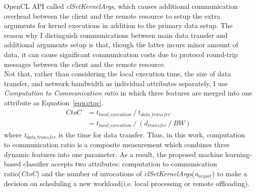 OpenCL API called {\it clSetKernelArgs}, which causes additional
communication overhead between the client and the remote resource to
setup the extra arguments for kernel executions in addition to the
primary data setup.
%
The reason why I distinguish communications between main data transfer
and additional arguments setup is that, though the latter incurs minor
amount of data, it can cause significant communication costs due to
protocol round-trip messages between the client and the remote
resource.\\
%
Not that, rather than considering the local execution time, the size of
data transfer, and network bandwidth as individual attributes
separately, I use {\it Computation to Communication ratio} in which
three features are merged into one attribute as Equation~\eqref{equ:ctoc}.
%
\begin{equation}
\begin{split}
	CtoC& = t_{local\_execution}\:/\: t_{data\_transfer} \\
	& = t_{local\_execution}\:/\:(d_{transfer}\:/\:BW)
\end{split}
\label{equ:ctoc}
\end{equation} 
%
where {\it t$_{data\_transfer}$} is the time for data transfer.
%
Thus, in this work, computation to communication ratio is a composite
measurement which combines three dynamic features into one parameter.
%
As a result, the proposed machine learning-based classifier accepts two
attributes: computation to communication ratio({\it CtoC}) and the
number of invocations of {\it clSetKernelArgs}({\it n$_{argset}$}) to
make a decision on scheduling a new workload(i.e. local processing or
remote offloading).
%

